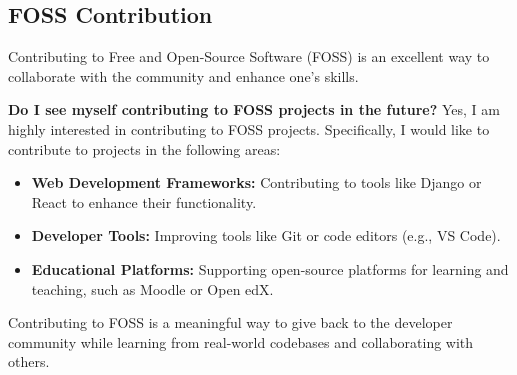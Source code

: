 \documentclass{article}
\begin{document}
\subsection{FOSS Contribution}
Contributing to Free and Open-Source Software (FOSS) is an excellent way to collaborate with the community and enhance one's skills. 

\textbf{Do I see myself contributing to FOSS projects in the future?}  
Yes, I am highly interested in contributing to FOSS projects. Specifically, I would like to contribute to projects in the following areas:
\begin{itemize}
 \item \textbf{Web Development Frameworks:} Contributing to tools like Django or React to enhance their functionality.
 \item \textbf{Developer Tools:} Improving tools like Git or code editors (e.g., VS Code).
 \item \textbf{Educational Platforms:} Supporting open-source platforms for learning and teaching, such as Moodle or Open edX.
\end{itemize}

Contributing to FOSS is a meaningful way to give back to the developer community while learning from real-world codebases and collaborating with others.
\end{document}

